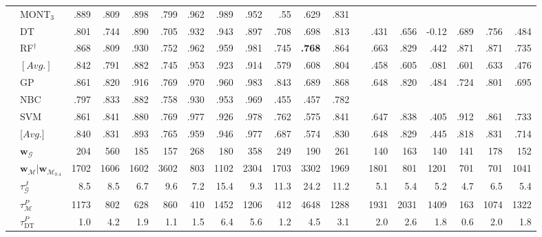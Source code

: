 \documentclass[11pt,a4paper]{article}
\begin{document}
\begin{table}
\begin{tabular}[t]{llrrrrrrrrrrrrrrrrr}
            & MONT$_3$ & .889 & .809 & .898 & .799 & .962 & .989 & .952 & .55 & .629 & .831  &  &  &  &  &  &  &  \\
            &  DT & .801 & .744 & .890 & .705 & .932 & .943 & .897 & .708 & .698 & .813 &  & .431 & .656 & -0.12 & .689 & .756 & .484 \\
            & RF$^{\dagger} $ & .868 & .809 & .930 & .752 & .962 & .959 & .981 & .745 & \textbf{.768} & .864 & & .663  & .829  & .442  & .871  & .871  & .735 \\[3pt]
            & $[Avg.]$ & .842  & .791  & .882  & .745  & .953  & .923  & .914  & .579  & .608  & .804 &   & .458  & .605  & .081  & .601  & .633  & .476 \\[5pt]
            \cmidrule{1-2}
            \parbox[t]{3mm}{}
            & GP & .861 & .820 & .916 & .769 & .970 & .960 & .983 & .843 & .689 & .868 &  & .648 & .820 & .484 & .724 & .801 & .695 \\
            & NBC & .797 & .833 & .882 & .758 & .930 & .953 & .969 & .455 & .457 & .782 &  &  &  &  &  &  &  \\
            & SVM & .861 & .841 & .880 & .769 & .977 & .926 & .978 & .762 & .575 & .841 &  & .647 & .838 & .405 & .912 & .861 & .733 \\[3pt]
            &[$Avg.$] & .840  & .831  & .893  & .765  & .959  & .946  & .977  & .687  & .574  & .830 &   & .648  & .829  & .445  & .818  & .831  & .714 \\[5pt]
            \parbox[t]{3mm}{}
            & $\textbf{w}_\mathcal{G}$ & 204 & 560 & 185 & 157 & 268 & 180 & 358 & 249 & 190 & 261 &  & 140 & 163 & 140 & 141 & 178 & 152 \\
            & $\textbf{w}_\mathcal{M} \vert \textbf{w}_{\mathcal{M}_{0.4}}$ & 1702 & 1606 & 1602 & 3602 & 803 & 1102 & 2304 & 1703 & 3302 & 1969 &  & 1801 & 801 & 1201 & 701 & 701 & 1041 \\[3pt]
& $\tau^{J}_{\mathcal{G}}$  & 8.5 & 8.5 & 6.7 & 9.6 & 7.2 & 15.4 & 9.3 & 11.3 & 24.2 & 11.2 &  & 5.1 & 5.4 & 5.2 & 4.7 & 6.5 & 5.4 \\
           	& $\tau^{P}_{\mathcal{M}}$ & 1173 & 802 & 628 & 860 & 410 & 1452 & 1206 & 412 & 4648 & 1288 &  & 1931 & 2031 & 1409 & 163 & 1074 & 1322\\
& $\tau^{P}_{\text{DT}}$ & 1.0 & 4.2 & 1.9 & 1.1 & 1.5 & 6.4 & 5.6 & 1.2 & 4.5 & 3.1 &  & 2.0 & 2.6 & 1.8 & 0.6 & 2.0 & 1.8 \\

\end{tabular}
\end{table}
\end{document}
